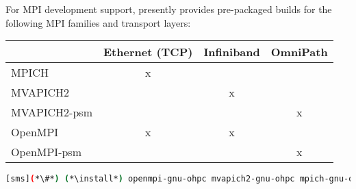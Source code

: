 For MPI development support, \OHPC{} presently provides pre-packaged builds for
the following MPI families and transport layers: 

\begin{table}[h]
\centering
\begin{tabular}{|l|l|l|l|}
\hline
             & Ethernet (TCP)         & Infiniband             & OmniPath               \\ \hline
MPICH        & \multicolumn{1}{c|}{x} &                        &                        \\ \hline
MVAPICH2     &                        & \multicolumn{1}{c|}{x} &                        \\ \hline
MVAPICH2-psm &                        &                        & \multicolumn{1}{c|}{x} \\ \hline
OpenMPI      & \multicolumn{1}{c|}{x} & \multicolumn{1}{c|}{x} &                        \\ \hline
OpenMPI-psm  &                        &                        & \multicolumn{1}{c|}{x} \\ \hline
\end{tabular}
\end{table}

\begin{lstlisting}[language=bash]
[sms](*\#*) (*\install*) openmpi-gnu-ohpc mvapich2-gnu-ohpc mpich-gnu-ohpc
\end{lstlisting}



